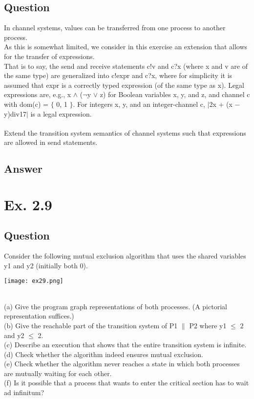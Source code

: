 \documentclass[12pt]{article}
\begin{document}
\subsection*{Question}
In channel systems, values can be transferred from one process to another process.\\
As this is somewhat limited, we consider in this exercise an extension that allows for the transfer
of expressions.\\
That is to say, the send and receive statements c!v and c?x (where x and v are of
the same type) are generalized into c!expr and c?x, where for simplicity it is assumed that expr
is a correctly typed expression (of the same type as x). Legal expressions are, e.g., x $\wedge$ ($\neg$y $\lor$ z)
for Boolean variables x, y, and z, and channel c with dom(c) = $\{$ 0, 1 $\}$. For integers x, y, and an
integer-channel c, $|$2x + (x − y)div17$|$ is a legal expression.\\
\\
Extend the transition system semantics of channel systems such that expressions are
allowed in send statements.

\subsection*{Answer}

\newpage
\section*{Ex. 2.9}
\subsection*{Question}
Consider the following mutual exclusion algorithm that uses the shared variables
y1 and y2 (initially both 0).\\
\begin{centering}
	\texttt{[image: ex29.png]}
\end{centering}
\\
(a) Give the program graph representations of both processes. (A pictorial representation suffices.)\\
(b) Give the reachable part of the transition system of P1 $\|$ P2 where y1 $\leq$ 2 and y2 $\leq$ 2.\\
(c) Describe an execution that shows that the entire transition system is infinite.\\
(d) Check whether the algorithm indeed ensures mutual exclusion.\\
(e) Check whether the algorithm never reaches a state in which both processes are mutually
waiting for each other.\\
(f) Is it possible that a process that wants to enter the critical section has to wait ad infinitum?\\
\end{document}
